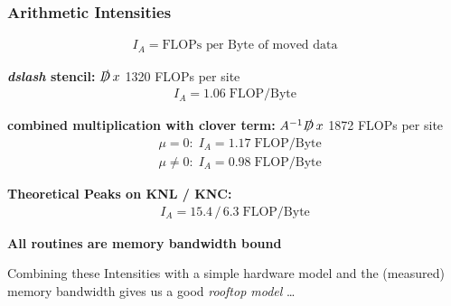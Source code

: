 \documentclass{beamer}
\begin{document}
  \begin{frame}
    \frametitle{Arithmetic Intensities}
    \vspace{-5mm}
    \footnotesize

    \begin{align*}
      I_A = \textrm{FLOPs per Byte of moved data}
    \end{align*}
    \vfill

    \textbf{\textit{dslash} stencil:} \; $\slashed D \,x$ \hfill 1320 FLOPs per site
    \begin{align*}
      I_A = 1.06 \; \textrm{FLOP/Byte}
    \end{align*}
    \vfill

    \textbf{combined multiplication with clover term:} \; $A^{-1}  \slashed D \, x$ \hfill 1872 FLOPs per site
    \begin{align*}
      &\mu = 0: \; I_A = 1.17 \; \textrm{FLOP/Byte} \\
      &\mu \neq 0: \; I_A = 0.98 \; \textrm{FLOP/Byte}
    \end{align*}
    \vfill

    \textbf{Theoretical Peaks on KNL / KNC:}
    \begin{align*}
      I_A = 15.4 \, / \, 6.3 \; \textrm{FLOP/Byte}
    \end{align*}
    \vfill

    {
          \large
      \centering \textbf{All routines are memory bandwidth bound}\\
  }

    \vfill

      Combining these Intensities with a simple hardware model and the (measured) memory bandwidth
      gives us a good \textit{rooftop model} \dots


  \end{frame}

\end{document}
